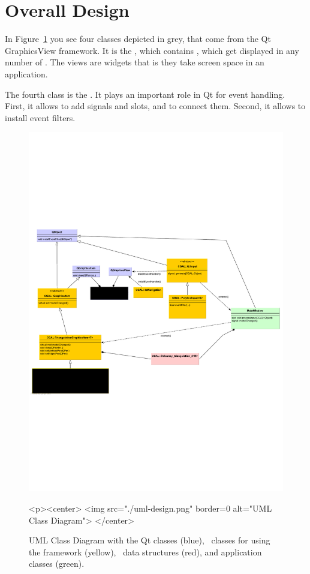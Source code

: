 \section{Overall Design}

In Figure~\ref{graphicsview:uml} you see four classes depicted in grey,
that come from the Qt GraphicsView framework. It is the ,
which contains , which get displayed in any number
of .   The views are widgets that is they take screen space
in an application.   

The fourth class is the . It plays an important role in Qt for
event handling. First, it allows to add signals and slots, and to connect them.
Second, it allows to install event filters. 


\begin{figure}[t]
\begin{ccTexOnly}
  \begin{center}
  \includegraphics{GraphicsView/uml-design}
  \end{center}
\end{ccTexOnly}
\begin{ccHtmlOnly}
  <p><center>
  <img src="./uml-design.png" border=0 alt="UML Class Diagram">
  </center>
\end{ccHtmlOnly}
\caption{UML Class Diagram with the Qt classes (blue), \cgal\ classes for using the framework (yellow),
\cgal\ data structures (red), and application classes (green). \label{graphicsview:uml}}
\end{figure}


